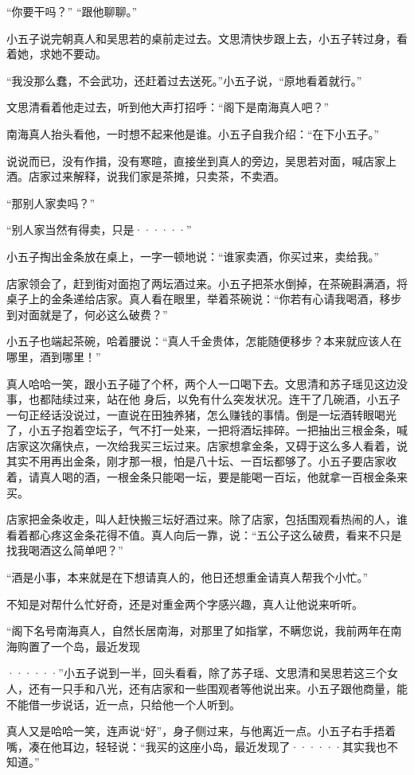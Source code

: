 “你要干吗？” “跟他聊聊。”

小五子说完朝真人和吴思若的桌前走过去。文思清快步跟上去，小五子转过身，看着她，求她不要动。

“我没那么蠢，不会武功，还赶着过去送死。”小五子说，“原地看着就行。”

文思清看着他走过去，听到他大声打招呼：“阁下是南海真人吧？”

南海真人抬头看他，一时想不起来他是谁。小五子自我介绍：“在下小五子。”

说说而已，没有作揖，没有寒暄，直接坐到真人的旁边，吴思若对面，喊店家上酒。店家过来解释，说我们家是茶摊，只卖茶，不卖酒。

“那别人家卖吗？”

“别人家当然有得卖，只是······”

小五子掏出金条放在桌上，一字一顿地说：“谁家卖酒，你买过来，卖给我。”

店家领会了，赶到街对面抱了两坛酒过来。小五子把茶水倒掉，在茶碗斟满酒，将桌子上的金条递给店家。真人看在眼里，举着茶碗说：“你若有心请我喝酒，移步到对面就是了，何必这么破费？”

小五子也端起茶碗，哈着腰说：“真人千金贵体，怎能随便移步？本来就应该人在哪里，酒到哪里！”

真人哈哈一笑，跟小五子碰了个杯，两个人一口喝下去。文思清和苏子瑶见这边没事，也都陆续过来，站在他
身后，以免有什么突发状况。连干了几碗酒，小五子一句正经话没说过，一直说在田独养猪，怎么赚钱的事情。倒是一坛酒转眼喝光了，小五子抱着空坛子，气不打一处来，一把将酒坛摔碎。一把抽出三根金条，喊店家这次痛快点，一次给我买三坛过来。店家想拿金条，又碍于这么多人看着，说其实不用再出金条，刚才那一根，怕是八十坛、一百坛都够了。小五子要店家收着，请真人喝的酒，一根金条只能喝一坛，要是能喝一百坛，他就拿一百根金条来买。

店家把金条收走，叫人赶快搬三坛好酒过来。除了店家，包括围观看热闹的人，谁看着都心疼这金条花得不值。真人向后一靠，说：“五公子这么破费，看来不只是找我喝酒这么简单吧？”

“酒是小事，本来就是在下想请真人的，他日还想重金请真人帮我个小忙。”

不知是对帮什么忙好奇，还是对重金两个字感兴趣，真人让他说来听听。

“阁下名号南海真人，自然长居南海，对那里了如指掌，不瞒您说，我前两年在南海购置了一个岛，最近发现

······”小五子说到一半，回头看看，除了苏子瑶、文思清和吴思若这三个女人，还有一只手和八光，还有店家和一些围观者等他说出来。小五子跟他商量，能不能借一步说话，近一点，只给他一个人听到。

真人又是哈哈一笑，连声说“好”，身子侧过来，与他离近一点。小五子右手捂着嘴，凑在他耳边，轻轻说：“我买的这座小岛，最近发现了······其实我也不知道。”

